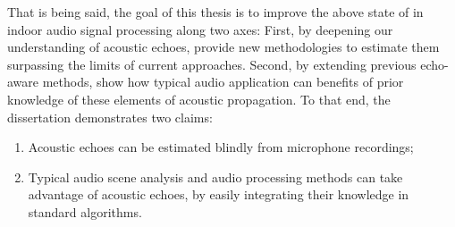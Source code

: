 That is being said, the goal of this thesis is to improve the above state of in indoor audio signal processing along two axes:
First, by deepening our understanding of acoustic echoes, provide new methodologies to estimate them surpassing the limits of current approaches.
Second, by extending previous echo-aware methods, show how typical audio application can benefits of prior knowledge of these elements of acoustic propagation.
\mynewline
To that end, the dissertation demonstrates two claims:
\begin{enumerate}
    \item Acoustic echoes can be estimated blindly from microphone recordings;
    \item Typical audio scene analysis and audio processing methods can take advantage of acoustic echoes, by easily integrating their knowledge in standard algorithms.
\end{enumerate}














